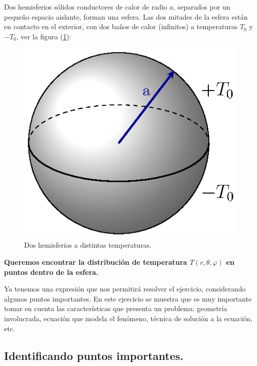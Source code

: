 Dos hemisferios sólidos conductores de calor de radio $a$, separados por un pequeño espacio aislante, forman una esfera. Las dos mitades de la esfera están en contacto en el exterior, con dos baños de calor (infinitos) a temperaturas $T_{0}$ y $-T_{0} $, ver la figura (\ref{fig:figura_esfera_01}):
\begin{figure}[H]
    \centering
    \includegraphics[scale=0.95]{Imagenes/Ejemplo_Esfera_01.eps}
    \caption{Dos hemisferios a distintas temperaturas.}
    \label{fig:figura_esfera_01}
\end{figure}

\textbf{Queremos encontrar la distribución de temperatura $T (r, \theta, \varphi)$ en puntos dentro de la esfera.}
\par
Ya tenemos una expresión que nos permitirá resolver el ejercicio, considerando algunos puntos importantes. En este ejercicio se muestra que es muy importante tomar en cuenta las características que presenta un problema: geometría involucrada, ecuación que modela el fenómeno, técnica de solución a la ecuación, etc.

\subsection{Identificando puntos importantes.}

